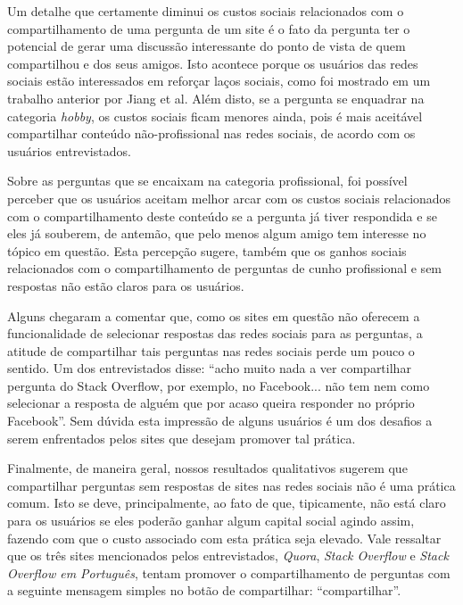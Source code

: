 Um detalhe que certamente diminui os custos sociais relacionados com o compartilhamento de uma pergunta de um site \qa é o fato da pergunta ter o potencial de gerar uma discussão interessante do ponto de vista de quem compartilhou e dos seus amigos. Isto acontece porque os usuários das redes sociais estão interessados em reforçar laços sociais, como foi mostrado em um trabalho anterior por Jiang et al. \cite{jiang2009social} Além disto, se a pergunta se enquadrar na categoria \textit{hobby}, os custos sociais ficam menores ainda, pois é mais aceitável compartilhar conteúdo não-profissional nas redes sociais, de acordo com os usuários entrevistados.

Sobre as perguntas que se encaixam na categoria profissional, foi possível perceber que os usuários aceitam melhor arcar com os custos sociais relacionados com o compartilhamento deste conteúdo se a pergunta já tiver respondida e se eles já souberem, de antemão, que pelo menos algum amigo tem interesse no tópico em questão. Esta percepção sugere, também que os ganhos sociais relacionados com o compartilhamento de perguntas de cunho profissional e sem respostas não estão claros para os usuários.

Alguns chegaram a comentar que, como os sites \qa em questão não oferecem a funcionalidade de selecionar respostas das redes sociais para as perguntas, a atitude de compartilhar tais perguntas nas redes sociais perde um pouco o sentido. Um dos entrevistados disse: ``acho muito nada a ver compartilhar pergunta do Stack Overflow, por exemplo, no Facebook... não tem nem como selecionar a resposta de alguém que por acaso queira responder no próprio Facebook''. Sem dúvida esta impressão de alguns usuários é um dos desafios a serem enfrentados pelos sites \qa que desejam promover tal prática.

Finalmente, de maneira geral, nossos resultados qualitativos sugerem que compartilhar perguntas sem respostas de sites \qa nas redes sociais não é uma prática comum. Isto se deve, principalmente, ao fato de que, tipicamente, não está claro para os usuários se eles poderão ganhar algum capital social agindo assim, fazendo com que o custo associado com esta prática seja elevado. Vale ressaltar que os três sites \qa mencionados pelos entrevistados, \textit{Quora}, \textit{Stack Overflow} e \textit{Stack Overflow em Português}, tentam promover o compartilhamento de perguntas com a seguinte mensagem simples no botão de compartilhar: ``compartilhar''.